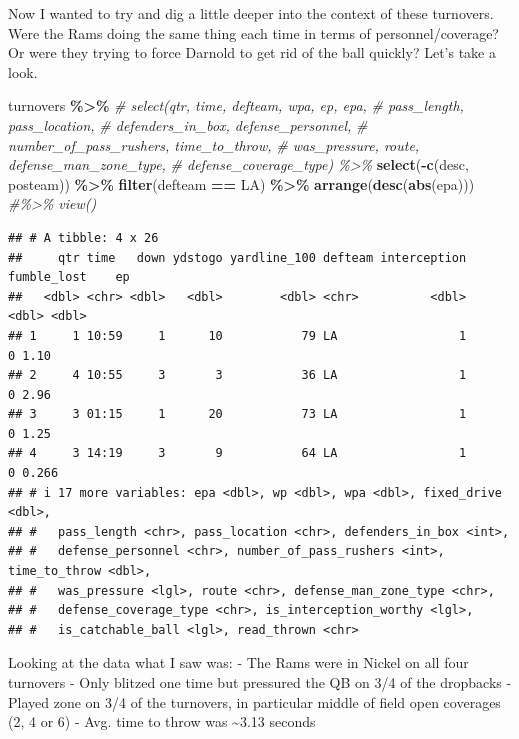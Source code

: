 \documentclass[
]{article}
\newenvironment{Shaded}{\begin{snugshade}}{\end{snugshade}}
\newcommand{\CommentTok}[1]{\textcolor[rgb]{0.56,0.35,0.01}{\textit{#1}}}
\newcommand{\FunctionTok}[1]{\textcolor[rgb]{0.13,0.29,0.53}{\textbf{#1}}}
\newcommand{\NormalTok}[1]{#1}
\newcommand{\SpecialCharTok}[1]{\textcolor[rgb]{0.81,0.36,0.00}{\textbf{#1}}}
\newcommand{\StringTok}[1]{\textcolor[rgb]{0.31,0.60,0.02}{#1}}
\begin{document}
Now I wanted to try and dig a little deeper into the context of these
turnovers. Were the Rams doing the same thing each time in terms of
personnel/coverage? Or were they trying to force Darnold to get rid of
the ball quickly? Let's take a look.

\begin{Shaded}
\begin{Highlighting}[]
\NormalTok{turnovers }\SpecialCharTok{\%\textgreater{}\%} 
     \CommentTok{\# select(qtr, time, defteam, wpa, ep, epa,}
     \CommentTok{\#        pass\_length, pass\_location,}
     \CommentTok{\#        defenders\_in\_box, defense\_personnel, }
     \CommentTok{\#        number\_of\_pass\_rushers, time\_to\_throw,}
     \CommentTok{\#        was\_pressure, route, defense\_man\_zone\_type,}
     \CommentTok{\#        defense\_coverage\_type) \%\textgreater{}\%}
    \FunctionTok{select}\NormalTok{(}\SpecialCharTok{{-}}\FunctionTok{c}\NormalTok{(desc, posteam)) }\SpecialCharTok{\%\textgreater{}\%}   
    \FunctionTok{filter}\NormalTok{(defteam }\SpecialCharTok{==} \StringTok{\textquotesingle{}LA\textquotesingle{}}\NormalTok{) }\SpecialCharTok{\%\textgreater{}\%}   
     \FunctionTok{arrange}\NormalTok{(}\FunctionTok{desc}\NormalTok{(}\FunctionTok{abs}\NormalTok{(epa))) }\CommentTok{\#\%\textgreater{}\% view()}
\end{Highlighting}
\end{Shaded}

\begin{verbatim}
## # A tibble: 4 x 26
##     qtr time   down ydstogo yardline_100 defteam interception fumble_lost    ep
##   <dbl> <chr> <dbl>   <dbl>        <dbl> <chr>          <dbl>       <dbl> <dbl>
## 1     1 10:59     1      10           79 LA                 1           0 1.10 
## 2     4 10:55     3       3           36 LA                 1           0 2.96 
## 3     3 01:15     1      20           73 LA                 1           0 1.25 
## 4     3 14:19     3       9           64 LA                 1           0 0.266
## # i 17 more variables: epa <dbl>, wp <dbl>, wpa <dbl>, fixed_drive <dbl>,
## #   pass_length <chr>, pass_location <chr>, defenders_in_box <int>,
## #   defense_personnel <chr>, number_of_pass_rushers <int>, time_to_throw <dbl>,
## #   was_pressure <lgl>, route <chr>, defense_man_zone_type <chr>,
## #   defense_coverage_type <chr>, is_interception_worthy <lgl>,
## #   is_catchable_ball <lgl>, read_thrown <chr>
\end{verbatim}

Looking at the data what I saw was: - The Rams were in Nickel on all
four turnovers - Only blitzed one time but pressured the QB on 3/4 of
the dropbacks - Played zone on 3/4 of the turnovers, in particular
middle of field open coverages (2, 4 or 6) - Avg. time to throw was
\textasciitilde3.13 seconds
\end{document}
